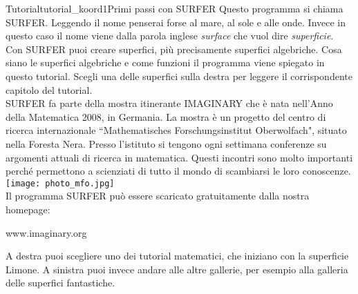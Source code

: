 \begin{surferIntroPage}{Tutorial}{tutorial_koord1}{Primi passi con SURFER}
Questo programma si chiama SURFER. Leggendo il nome penserai forse al mare,  al sole e alle onde. Invece in questo caso il nome viene dalla parola inglese {\it surface} che vuol dire {\it superficie}.
\\
Con SURFER puoi creare superfici, pi\`u precisamente superfici algebriche. Cosa siano le superfici algebriche e come funzioni il programma viene spiegato in questo tutorial. Scegli una delle superfici sulla destra per leggere il corrispondente capitolo del tutorial.\\
SURFER fa parte della mostra itinerante IMAGINARY che \`e nata nell'Anno della Matematica 2008, in Germania. La mostra \`e un progetto del centro di ricerca internazionale ``Mathematisches Forschungsinstitut Oberwolfach", situato nella Foresta Nera.  Presso l'istituto  si tengono ogni settimana conferenze su argomenti attuali di ricerca in matematica. Questi incontri sono molto importanti perch\'e permettono a scienziati di tutto il mondo di scambiarsi le loro conoscenze.\\
\vspace{0.2cm} \hspace{3.5cm}\texttt{[image: photo\_mfo.jpg]}\\
Il programma SURFER pu\`o essere scaricato gratuitamente dalla nostra homepage:\\
\begin{centering}
www.imaginary.org\\
\end{centering}
 \vspace{0.2cm}
A destra puoi scegliere uno dei tutorial matematici, che iniziano con la superficie Limone. A sinistra puoi invece andare alle altre gallerie, per esempio alla galleria delle superfici fantastiche.
\end{surferIntroPage}


